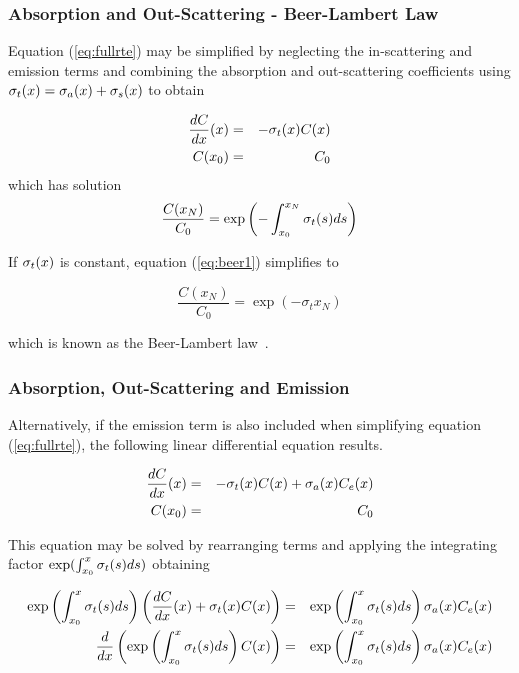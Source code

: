 %
%

\subsubsection{Absorption and Out-Scattering - Beer-Lambert Law}
Equation (\ref{eq:fullrte}) may be simplified by neglecting the in-scattering and emission terms and combining the absorption and out-scattering coefficients using $\sigma_t(x)=\sigma_a(x)+\sigma_s(x)$ to obtain

\begin{eqnarray*}
\frac{dC}{dx}(x)&=&-\sigma_t(x) C(x)\\
C(x_0)&=&C_0
\end{eqnarray*}
which has solution
\begin{equation}
\label{eq:beer1} \frac{C(x_N)}{C_0}=\exp\left({-\int_{{x_0}}^{x_N} \sigma_t(s) ds}\right)
\end{equation}

If $\sigma_t(x)$ is constant, equation (\ref{eq:beer1}) simplifies to

\begin{equation}
\label{eq:beer2} \frac{C(x_N)}{C_0}=\exp(-\sigma_t x_N)
\end{equation}

which is known as the Beer-Lambert law~\cite{Siegel:2001}.

%
%

\subsubsection{Absorption, Out-Scattering and Emission}

Alternatively, if the emission term is also included when simplifying equation (\ref{eq:fullrte}),  the following linear differential equation results.

\begin{eqnarray}
\label{eq:simple_rte}
\frac{dC}{dx}(x)&=&-\sigma_t(x) C(x) + \sigma_a(x) C_e(x)\\
 C(x_0)&=&C_0\nonumber
\end{eqnarray}

This equation may be solved by rearranging terms and applying the integrating factor $\exp(\int_{x_0}^x \sigma_t(s) ds)$ obtaining

\begin{eqnarray*}
\exp\left({\int_{x_0}^{x} \sigma_t(s) ds}\right)\left(\frac{dC}{dx}(x)+\sigma_t(x) C(x)\right)&=&  \exp\left({\int_{x_0}^{x} \sigma_t(s) ds}\right)\sigma_a(x) C_e(x)\\
\frac{d}{dx}\left(\exp\left({\int_{x_0}^{x} \sigma_t(s) ds}\right) C(x)\right)&=& \exp\left({\int_{x_0}^{x} \sigma_t(s) ds}\right)\sigma_a(x) C_e(x)
\end{eqnarray*}

